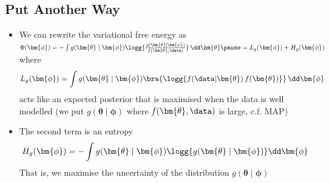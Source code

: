 \begin{slide}
\section[-2]{Put Another Way}

\begin{PauseHighLight}
  \begin{itemize}
  \item We can rewrite the variational free energy as $\Phi(\bm{\phi})
    =-\int g(\bm{\theta}\mid\bm{\phi})
      \logg{\frac{g(\bm{\theta}\mid\bm{\phi})}{f(\bm{\theta}, \data)}} \,
      \dd \bm{\theta}\pause =  L_g(\bm{\phi}) + H_g(\bm{\phi})$\pause{} where
    \begin{align*}
      L_g(\bm{\phi}) = \int g(\bm{\theta}\mid\bm{\phi}) \bra{
      \logg{\strut f(\data| \bm{\theta}) \, f(\bm{\theta})} } \, \dd \bm{\phi}
    \end{align*}
    acts like an expected posterior that is maximised when the
    data is well modelled (we put
    $g(\bm{\theta}\mid\bm{\phi})$ where $f(\bm{\theta}, \data)$ is
    large, c.f. MAP)\pause
  \item The second term is an entropy
    \begin{align*}
      H_g(\bm{\phi}) = - \int g(\bm{\theta}\mid\bm{\phi})
      \logg{\strut g(\bm{\theta}\mid\bm{\phi})} \dd \bm{\phi}
    \end{align*}
    That is, we maximise the uncertainty of the distribution $g(\bm{\theta}\mid\bm{\phi})$\pause
  \end{itemize}
\end{PauseHighLight}

\end{slide}




